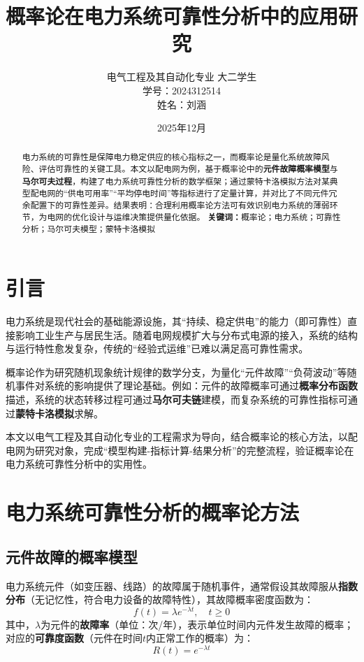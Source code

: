 \documentclass[12pt,a4paper]{article}
\begin{document}
\title{概率论在电力系统可靠性分析中的应用研究}
\author{电气工程及其自动化专业 大二学生\\学号：2024312514\\姓名：刘涵}
\date{2025年12月}
\maketitle

\begin{abstract}
  电力系统的可靠性是保障电力稳定供应的核心指标之一，而概率论是量化系统故障风险、评估可靠性的关键工具。本文以配电网为例，基于概率论中的\textbf{元件故障概率模型}与\textbf{马尔可夫过程}，构建了电力系统可靠性分析的数学框架；通过蒙特卡洛模拟方法对某典型配电网的“供电可用率”“平均停电时间”等指标进行了定量计算，并对比了不同元件冗余配置下的可靠性差异。结果表明：合理利用概率论方法可有效识别电力系统的薄弱环节，为电网的优化设计与运维决策提供量化依据。
  \textbf{关键词：}概率论；电力系统；可靠性分析；马尔可夫模型；蒙特卡洛模拟
\end{abstract}


\section{引言}
电力系统是现代社会的基础能源设施，其“持续、稳定供电”的能力（即可靠性）直接影响工业生产与居民生活\cite{power_reliability}。随着电网规模扩大与分布式电源的接入，系统的结构与运行特性愈发复杂，传统的“经验式运维”已难以满足高可靠性需求。

概率论作为研究随机现象统计规律的数学分支，为量化“元件故障”“负荷波动”等随机事件对系统的影响提供了理论基础。例如：元件的故障概率可通过\textbf{概率分布函数}描述，系统的状态转移过程可通过\textbf{马尔可夫链}建模，而复杂系统的可靠性指标可通过\textbf{蒙特卡洛模拟}求解。

本文以电气工程及其自动化专业的工程需求为导向，结合概率论的核心方法，以配电网为研究对象，完成“模型构建-指标计算-结果分析”的完整流程，验证概率论在电力系统可靠性分析中的实用性。


\section{电力系统可靠性分析的概率论方法}
\subsection{元件故障的概率模型}
电力系统元件（如变压器、线路）的故障属于随机事件，通常假设其故障服从\textbf{指数分布}（无记忆性，符合电力设备的故障特性），其故障概率密度函数为：
\[
f(t) = \lambda e^{-\lambda t}, \quad t \geq 0
\]
其中，$\lambda$为元件的\textbf{故障率}（单位：次/年），表示单位时间内元件发生故障的概率；对应的\textbf{可靠度函数}（元件在时间$t$内正常工作的概率）为：
\[
R(t) = e^{-\lambda t}
\]
\end{document}

